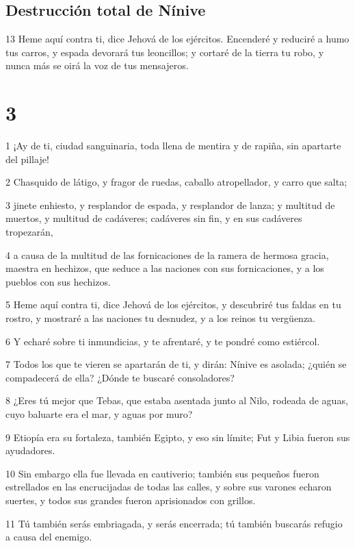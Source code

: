 \section*{Destrucción total de Nínive}

\par 13 Heme aquí contra ti, dice Jehová de los ejércitos. Encenderé y reduciré a humo tus carros, y espada devorará tus leoncillos; y cortaré de la tierra tu robo, y nunca más se oirá la voz de tus mensajeros.

\chapter{3}

\par 1 ¡Ay de ti, ciudad sanguinaria, toda llena de mentira y de rapiña, sin apartarte del pillaje!
\par 2 Chasquido de látigo, y fragor de ruedas, caballo atropellador, y carro que salta;
\par 3 jinete enhiesto, y resplandor de espada, y resplandor de lanza; y multitud de muertos, y multitud de cadáveres; cadáveres sin fin, y en sus cadáveres tropezarán,
\par 4 a causa de la multitud de las fornicaciones de la ramera de hermosa gracia, maestra en hechizos, que seduce a las naciones con sus fornicaciones, y a los pueblos con sus hechizos.
\par 5 Heme aquí contra ti, dice Jehová de los ejércitos, y descubriré tus faldas en tu rostro, y mostraré a las naciones tu desnudez, y a los reinos tu vergüenza.
\par 6 Y echaré sobre ti inmundicias, y te afrentaré, y te pondré como estiércol.
\par 7 Todos los que te vieren se apartarán de ti, y dirán: Nínive es asolada; ¿quién se compadecerá de ella? ¿Dónde te buscaré consoladores?
\par 8 ¿Eres tú mejor que Tebas, que estaba asentada junto al Nilo, rodeada de aguas, cuyo baluarte era el mar, y aguas por muro?
\par 9 Etiopía era su fortaleza, también Egipto, y eso sin límite; Fut y Libia fueron sus ayudadores.
\par 10 Sin embargo ella fue llevada en cautiverio; también sus pequeños fueron estrellados en las encrucijadas de todas las calles, y sobre sus varones echaron suertes, y todos sus grandes fueron aprisionados con grillos.
\par 11 Tú también serás embriagada, y serás encerrada; tú también buscarás refugio a causa del enemigo.

